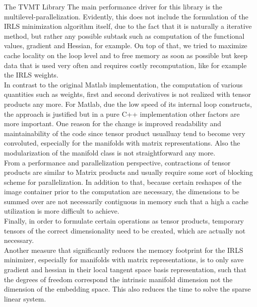 \begin{chapter}{The TVMT Library}
The main performance driver for this library is the multilevel-parallelization. Evidently, this does not include the formulation of the IRLS minimization algorithm itself, due to the fact that
it is naturally a iterative method, but rather any possible subtask such as computation of the functional values, gradient and Hessian, for example. On top of that, we tried to
maximize cache locality on the loop level and to free memory as soon as possible but keep data that is used very often and requires costly recomputation, like for example the IRLS weights.\\ 

In contrast to the original Matlab implementation, the computation of various quantities such as weights, first and second derivatives is not realized with tensor products any more.
For Matlab, due the low speed of its internal loop constructs, the approach is justified but in a pure C++ implementation other factors are more important.
One reason for the change is improved readability and maintainability of the code since tensor product usualluay tend to become very convoluted,
especially for the manifolds with matrix representations. Also the modularization of the manifold class is not straightforward any more.\\
From a performance and parallelization perspective, contractions of tensor products are similar to Matrix products and usually require some sort of blocking scheme for parallelization.
In addition to that, because certain reshapes of the image container prior to the computation are necessary, the dimensions to be summed over are not necessarily contiguous in memory
such that a high a cache utilization is more difficult to achieve.\\
Finally, in order to formulate certain operations as tensor products, temporary tensors of the correct dimensionality need to be created, which are actually not necessary.\\

Another measure that significantly reduces the memory footprint for the IRLS minimizer, especially for manifolds with matrix representations, is to only save gradient and hessian
in their local tangent space basis representation, such that the degrees of freedom correspond the intrinsic manifold dimension not the dimension of the embedding space. This also reduces
the time to solve the sparse linear system.\\


\end{chapter}
